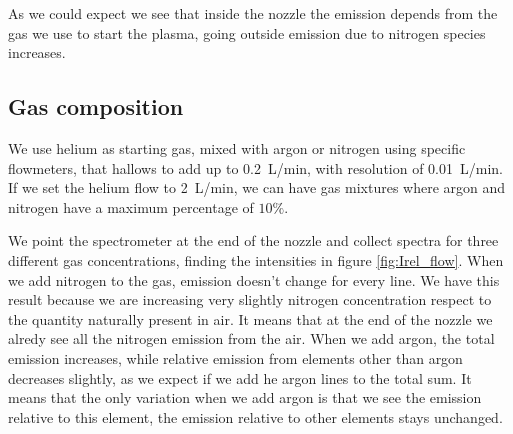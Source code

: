 As we could expect we see that inside the nozzle the emission depends from the gas we use to start the plasma, going outside emission due to nitrogen species increases.


\subsection{Gas composition}
We use helium as starting gas, mixed with argon or nitrogen using specific flowmeters, that hallows to add up to \SI{0.2}{\liter/\minute}, with resolution of \SI{0.01}{\liter/\minute}.
If we set the helium flow to \SI{2}{\liter/\minute}, we can have gas mixtures where argon and nitrogen have a maximum percentage of $\num{10}\%$.

We point the spectrometer at the end of the nozzle and collect spectra for three different gas concentrations, finding the intensities in figure \ref{fig:Irel_flow}.
When we add nitrogen to the gas, emission doesn't change for every line. We have this result because we are increasing very slightly nitrogen concentration respect to the quantity naturally present in air. It means that at the end of the nozzle we alredy see all the nitrogen emission from the air.
When we add argon, the total emission increases, while relative emission from elements other than argon decreases slightly, as we expect if we add he argon lines to the total sum. It means that the only variation when we add argon is that we see the emission relative to this element, the emission relative to other elements stays unchanged.
